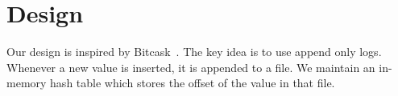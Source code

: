 \chapter{Design}
\label{chap:design}

Our design is inspired by Bitcask~\cite{sheehy2010bitcask}. The key idea is to use append only logs. Whenever a new value is inserted, it is appended to a file. We maintain an in-memory hash table which stores the offset of the value in that file.
